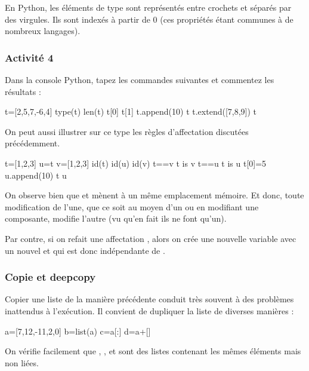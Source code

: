 \documentclass[11pt,a4paper,french,twoside]{PMCours}
\begin{document}
\medskip
En Python, les éléments de type  sont représentés entre crochets 
\code{[ ]} et séparés par des virgules. 
Ils sont indexés à partir de $0$ (ces propriétés étant communes à de 
nombreux langages).

\subsubsection*{Activité 4}
Dans la console Python, tapez les commandes suivantes et commentez les résultats :
\begin{Python}
t=[2,5,7,-6,4]
type(t)
len(t)
t[0]
t[1]
t.append(10)
t
t.extend([7,8,9])
t
\end{Python}
On peut aussi illustrer sur ce type les règles d'affectation discutées précédemment. 
\begin{Python}
t=[1,2,3]
u=t
v=[1,2,3]
id(t)
id(u)
id(v)
t==v
t is v
t==u
t is u
t[0]=5
u.append(10)
t
u
\end{Python}
On observe bien que  et  mènent à un même emplacement 
mémoire. Et donc, toute modification de l'une, que ce soit au moyen d'un 
 ou en modifiant une composante, modifie l'autre (vu qu'en 
fait ils ne font qu'un).

Par contre, si on refait une affectation , alors on crée une nouvelle 
variable  avec un nouvel  et qui est donc indépendante de .
\subsubsection*{Copie et deepcopy}
Copier une liste de la manière précédente conduit très souvent à des problèmes
inattendus à l'exécution. Il convient de dupliquer la liste de diverses manières :    
\begin{Python}
a=[7,12,-11,2,0] 
b=list(a)
c=a[:]
d=a+[]
\end{Python}
On vérifie facilement que , ,  et  sont des 
listes contenant les mêmes éléments mais non liées.
\end{document}
